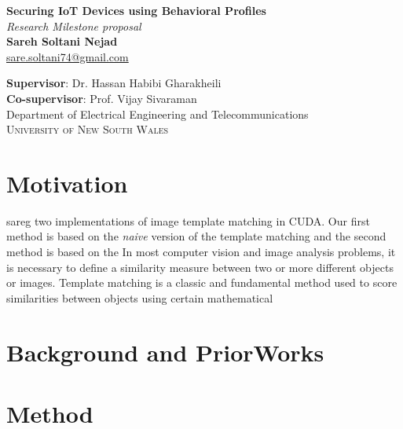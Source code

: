 \begin{titlepage}
	
	\begin{center}
		
		\textsc \large \textbf{Securing IoT Devices using Behavioral Profiles}\\ \small \emph{Research Milestone proposal}\\[0.1in]
		
		
		\vspace{0.2in}
		\normalsize \textbf{Sareh Soltani Nejad}\\
		\vspace{0.06in}
		{ \href{mailto:sare.soltani74@gmail.com}{\small sare.soltani74@gmail.com}}
		
		\vspace{.1in}
		\normalsize{\textbf{Supervisor}: Dr. Hassan Habibi Gharakheili}\\
		\normalsize{\textbf{Co-supervisor}: Prof. Vijay Sivaraman}\\
		
		\vspace{.2in}
		\normalsize{Department of Electrical Engineering and Telecommunications}\\
		\normalsize
		\textsc{University of New South Wales}\\
								
	\end{center}
	\section{Motivation}
	sareg
	two implementations of image template matching in CUDA. Our first method is based on the \textit{naive} version of the template matching and the second method is based on the 
	In most computer vision and image analysis problems, it is necessary to define a similarity measure between two or more different objects or images. Template matching is a classic and fundamental method used to score similarities between objects using certain mathematical
	\section{Background and PriorWorks}	
	\section{Method}	
\end{titlepage}